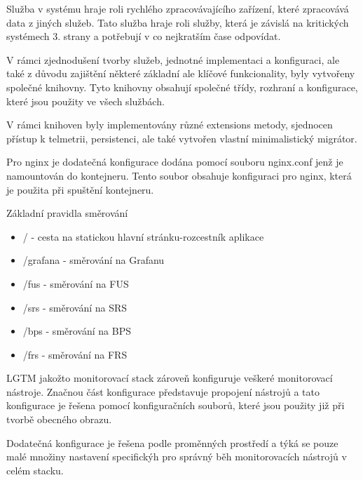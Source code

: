 
Služba v systému hraje roli rychlého zpracovávajícího zařízení, které zpracovává data z jiných služeb. Tato služba hraje roli služby, která je závislá na kritických systémech 3. strany a potřebují v co nejkratším čase odpovídat.


V rámci zjednodušení tvorby služeb, jednotné implementaci a konfiguraci, ale také z důvodu zajištění některé základní ale klíčové funkcionality, byly vytvořeny společné knihovny. Tyto knihovny obsahují společné třídy, rozhraní a konfigurace, které jsou použity ve všech službách.

V rámci knihoven byly implementovány různé extensions metody, sjednocen přístup k telmetrii, persistenci, ale také vytvořen vlastní minimalistický migrátor.




Pro nginx je dodatečná konfigurace dodána pomocí souboru nginx.conf jenž je namountován do kontejneru. Tento soubor obsahuje konfiguraci pro nginx, která je použita při spuštění kontejneru.

Základní pravidla směrování

\begin{itemize}
    \item / - cesta na statickou hlavní stránku-rozcestník aplikace
    \item /grafana - směrování na Grafanu
    \item /fus - směrování na FUS
    \item /srs - směrování na SRS
    \item /bps - směrování na BPS
    \item /frs - směrování na FRS
\end{itemize}


LGTM jakožto monitorovací stack zároveň konfiguruje veškeré monitorovací nástroje. Značnou část konfigurace představuje propojení nástrojů a tato konfigurace je řešena pomocí konfiguračních souborů, které jsou použity již při tvorbě obecného obrazu.

Dodatečná konfigurace je řešena podle proměnných prostředí a týká se pouze malé množiny nastavení specifickýh pro správný běh monitorovacích nástrojů v celém stacku.

